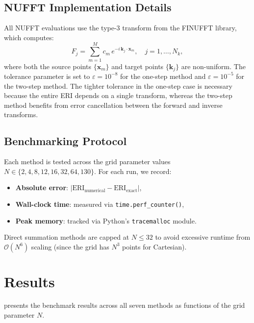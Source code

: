 \documentclass[12pt,a4paper]{article}
\begin{document}
\subsection{NUFFT Implementation Details}

All NUFFT evaluations use the type-3 transform from the FINUFFT library, which computes:
\begin{equation}
 F_j = \sum_{m=1}^{M} c_m\,e^{-i\,\mathbf{k}_j \cdot \mathbf{x}_m}, \quad j = 1, \ldots, N_k,
    \label{eq:nufft_type3}
\end{equation}
where both the source points $\{\mathbf{x}_m\}$ and target points $\{\mathbf{k}_j\}$ are non-uniform. The tolerance parameter is set to $\varepsilon = 10^{-8}$ for the one-step method and $\varepsilon = 10^{-5}$ for the two-step method. The tighter tolerance in the one-step case is necessary because the entire ERI depends on a single transform, whereas the two-step method benefits from error cancellation between the forward and inverse transforms.


\subsection{Benchmarking Protocol}

Each method is tested across the grid parameter values $N \in \{2, 4, 8, 12, 16, 32, 64, 130\}$. For each run, we record:
\begin{itemize}
    \item \textbf{Absolute error}: $|\text{ERI}_{\text{numerical}} - \text{ERI}_{\text{exact}}|$,
    \item \textbf{Wall-clock time}: measured via \texttt{time.perf\_counter()},
    \item \textbf{Peak memory}: tracked via Python's \texttt{tracemalloc} module.
\end{itemize}
Direct summation methods are capped at $N \leq 32$ to avoid excessive runtime from $\mathcal{O}(N^6)$ scaling (since the grid has $N^3$ points for Cartesian).

\section{Results}
\label{sec:results}

 presents the benchmark results across all seven methods as functions of the grid parameter $N$.
\end{document}
